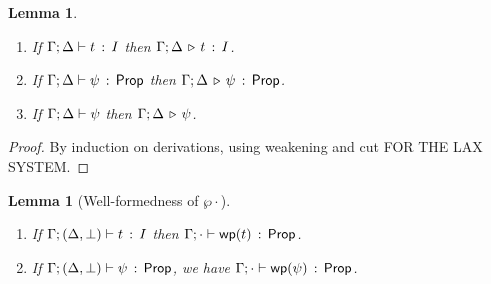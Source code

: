 \documentclass[10pt,a4paper]{article}
\newtheorem{lemma}[theorem]{Lemma}
\begin{document}
\begin{lemma}
\mbox{}
\begin{enumerate}
  \item If $\Gamma;\Delta \vdash t\, :\, I$ then 
    $\Gamma;\Delta \,\triangleright\, t\, :\, I$.
  \item If $\Gamma;\Delta \vdash \psi\, :\, \mathsf{Prop}$ then
    $\Gamma;\Delta \,\triangleright\, \psi\,:\, \mathsf{Prop}$.
  \item If $\Gamma;\Delta \vdash \psi$ then
    $\Gamma;\Delta \,\triangleright\, \psi$.
\end{enumerate}
\end{lemma}

\begin{proof}
By induction on derivations, using weakening and cut FOR THE LAX SYSTEM.
\end{proof}


\begin{lemma}[Well-formedness of  $\wp{\cdot}$]
\label{lemma:wfwp}
\mbox{}
  \begin{enumerate}
  \item If $\Gamma;(\Delta,\bot) \vdash t\, :\, I$ then
    $\Gamma;\cdot \vdash \mathop{\mathsf{wp}}(t)\, :\, \mathsf{Prop}$.
  \item If $\Gamma;(\Delta,\bot) \vdash \psi\, :\, \mathsf{Prop}$, we have
    $\Gamma;\cdot \vdash \mathop{\mathsf{wp}}(\psi)\, :\, \mathsf{Prop}$.
  \end{enumerate}
\end{lemma}
\end{document}
